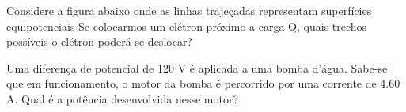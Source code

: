 \documentclass[12pt, addpoints]{exam}
\begin{document}
\begin{questions}
\begin{multicols*}{2}
\begin{oneparchoices}
\end{oneparchoices}
\question[20] Considere a figura abaixo onde as linhas trajeçadas representam superfícies equipotenciais Se colocarmos um elétron próximo a carga Q, quais trechos possíveis o elétron poderá se deslocar?
        
        \begin{center}
            \begin{minipage}[c]{0.5\linewidth}
            \end{minipage}
        \end{center}
        
        

\begin{oneparchoices}
\end{oneparchoices}
\question[20] Uma diferença de potencial de 120 V é aplicada a uma bomba d’água. Sabe-se que em funcionamento, o motor da bomba é percorrido por uma corrente de    4.60 A. Qual é a potência desenvolvida nesse motor?


\end{multicols*}
\end{questions}
\end{document}
